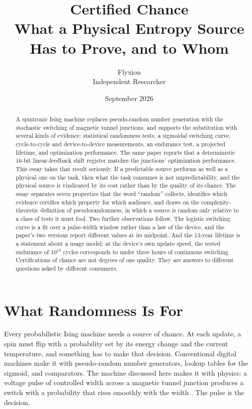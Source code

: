 \documentclass[11pt]{article}
\title{Certified Chance\\[4pt]
\large What a Physical Entropy Source Has to Prove, and to Whom}
\author{Flyxion\\ Independent Researcher}
\date{September 2026}
\theoremstyle{definition}
\theoremstyle{remark}
\begin{document}
\maketitle

\begin{abstract}
A spintronic Ising machine replaces pseudo-random number generation with the stochastic switching of magnetic tunnel junctions, and supports the substitution with several kinds of evidence: statistical randomness tests, a sigmoidal switching curve, cycle-to-cycle and device-to-device measurements, an endurance test, a projected lifetime, and optimization performance. The same paper reports that a deterministic 16-bit linear-feedback shift register matches the junctions' optimization performance. This essay takes that result seriously. If a predictable source performs as well as a physical one on the task, then what the task consumes is not unpredictability, and the physical source is vindicated by its cost rather than by the quality of its chance. The essay separates seven properties that the word ``random'' collects, identifies which evidence certifies which property for which audience, and draws on the complexity-theoretic definition of pseudorandomness, in which a source is random only relative to a class of tests it must fool. Two further observations follow. The logistic switching curve is a fit over a pulse-width window rather than a law of the device, and the paper's two versions report different values at its midpoint. And the 13-year lifetime is a statement about a usage model: at the device's own update speed, the tested endurance of $10^{13}$ cycles corresponds to under three hours of continuous switching. Certifications of chance are not degrees of one quality. They are answers to different questions asked by different consumers.
\end{abstract}

\section{What Randomness Is For}

Every probabilistic Ising machine needs a source of chance. At each update, a spin must flip with a probability set by its energy change and the current temperature, and something has to make that decision. Conventional digital machines make it with pseudo-random number generators, lookup tables for the sigmoid, and comparators. The machine discussed here makes it with physics: a voltage pulse of controlled width across a magnetic tunnel junction produces a switch with a probability that rises smoothly with the width \cite{li2026}. The pulse is the decision.
\end{document}

